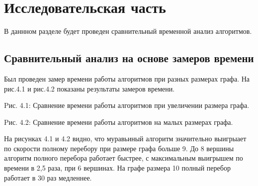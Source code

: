 \documentclass[12pt]{report}
\begin{document}
\chapter{Исследовательская часть}
В даннном разделе будет проведен сравнительный временной анализ алгоритмов.

\section{Сравнительный анализ на основе замеров времени}
Был проведен замер времени работы алгоритмов при разных размерах графа. На рис.4.1 и рис.4.2 показаны результаты замеров времени.


\begin{center}
	Pис. 4.1: Сравнение времени работы алгоритмов при увеличении размера графа.
\end{center}

\begin{center}
	Pис. 4.2: Сравнение времени работы алгоритмов на малых размерах графа.
\end{center}

На рисунках 4.1 и 4.2 видно, что муравьиный алгоритм значительно выигрыает по скорости полному перебору при размере графа больше 9.
До 8 вершины алгоритм полного перебора работает быстрее, с максимальным выигрышем по времени в 2,5 раза, при 6 вершинах.
На графе размера 10 полный перебор работает в 30 раз медленнее. 
\end{document}
